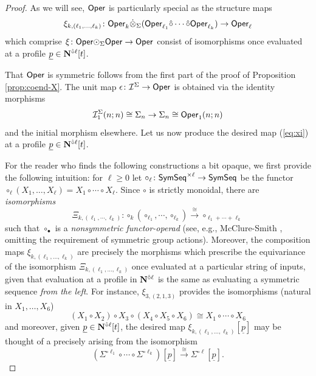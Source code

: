 \begin{proof} As we will see, $\mathsf{Oper}$ is particularly special as the structure maps \begin{equation} \label{eq:xi} 
    \xi_{k,(\ell_1,\dots,\ell_k)}\colon \mathsf{Oper}_{k} \dot{\otimes}_{\Sigma} (\mathsf{Oper}_{\ell_1} \hat{\circ} \cdots \hat{\circ} \mathsf{Oper}_{\ell_k}) \to \mathsf{Oper}_{\ell}
\end{equation} which comprise $\xi\colon \mathsf{Oper} {\odot}_{\Sigma} \mathsf{Oper} \to \mathsf{Oper}$ consist of isomorphisms once evaluated at a profile $\underline{p}\in \mathbf{N}^{\hat{\circ}\ell}[t]$. 

That $\mathsf{Oper}$ is symmetric follows from the first part of the proof of Proposition \ref{prop:coend-X}.  The unit map $\epsilon \colon \mathcal{I}^{\Sigma} \to \mathsf{Oper}$ is obtained via the identity morphisms \[ \mathcal{I}^{\Sigma}_1(n;n)\cong \Sigma_n \to \Sigma_n \cong \mathsf{Oper}_1(n;n) \] and the initial morphism elsewhere. Let us now produce the desired map (\ref{eq:xi}) at a profile $\underline{p}\in \mathbf{N}^{\hat{\circ}\ell}[t]$. 

For the reader who finds the following constructions a bit opaque, we first provide the following intuition: for $\ell\geq 0$ let $\circ_{\ell} \colon \mathsf{SymSeq}^{\times \ell}\to \mathsf{SymSeq}$ be the functor $\circ_{\ell} (X_1,\dots,X_{\ell}) =X_1 \circ \cdots \circ X_{\ell}$. Since $\circ$ is strictly monoidal, there are \textit{isomorphisms} \begin{equation} \label{eq:Xi-fo} \Xi_{k,(\ell_1,\cdots,\ell_k)}\colon \circ_k (\circ_{\ell_1},\cdots, \circ_{\ell_k}) \xrightarrow{\cong} \circ_{\ell_1+\cdots+\ell_k}\end{equation} such that $\circ_{\bullet}$ is a \textit{nonsymmetric functor-operad} (see, e.g.,  McClure-Smith \cite[]{MS-box}, omitting the requirement of symmetric group actions). %
Moreover, the composition maps $\xi_{k,(\ell_1,\dots,\ell_k)}$ are precisely the morphisms which prescribe the equivariance of the isomorphism $\Xi_{k,(\ell_1,\dots,\ell_k)}$ once evaluated at a particular string of inputs, given that evaluation at a profile in $\mathbf{N}^{\hat{\circ}\ell}$ is the same as evaluating a symmetric sequence \textit{from the left}. For instance, $\xi_{3,(2,1,3)}$ provides the isomorphisms (natural in $X_1,\dots,X_6$) \[ (X_1\circ X_2) \circ X_3 \circ (X_4\circ X_5 \circ X_6) \cong  X_1 \circ \cdots \circ X_6\] 
and moreover, given $\underline{p}\in\mathbf{N}^{\hat{\circ}\ell}[t]$, the desired map $\xi_{k,(\ell_1,\dots,\ell_k)}[\underline{p}]$ may be thought of a precisely arising from the isomorphism \[ \left(\Sigma^{\circ \ell_1} \circ \cdots \circ \Sigma^{\circ \ell_k}\right)[\underline{p}]\xrightarrow{\cong}\Sigma^{\circ \ell} [\underline{p}].\]


\end{proof}
